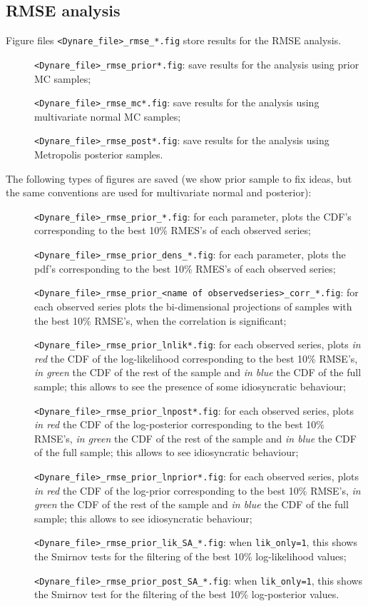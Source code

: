 \documentclass[12pt,a4paper]{article}
\begin{document}
\subsection{RMSE analysis}
Figure files \verb"<Dynare_file>_rmse_*.fig" store results for the
RMSE analysis.
\begin{description}
\item[]\verb"<Dynare_file>_rmse_prior*.fig": save results for
the analysis using prior MC samples;
\item[]\verb"<Dynare_file>_rmse_mc*.fig": save results for
the analysis using multivariate normal MC samples;
\item[]\verb"<Dynare_file>_rmse_post*.fig": save results for
the analysis using Metropolis posterior samples.
\end{description}

The following types of figures are saved (we show prior sample to
fix ideas, but the same conventions are used for multivariate
normal and posterior):
\begin{description}
\item[]\verb"<Dynare_file>_rmse_prior_*.fig": for each parameter, plots the CDF's
corresponding to the best 10\% RMES's of each observed series;
\item[]\verb"<Dynare_file>_rmse_prior_dens_*.fig": for each parameter, plots the pdf's
corresponding to the best 10\% RMES's of each observed series;
\item[]\verb"<Dynare_file>_rmse_prior_<name of observedseries>_corr_*.fig": for each observed series plots the
bi-dimensional projections of samples with the best 10\% RMSE's,
when the correlation is significant;
\item[]\verb"<Dynare_file>_rmse_prior_lnlik*.fig": for each observed
series, plots \emph{in red} the CDF of the log-likelihood
corresponding to the best 10\% RMSE's, \emph{in green} the CDF of
the rest of the sample and \emph{in blue }the CDF of the full
sample; this allows to see the  presence of some idiosyncratic
behaviour;
\item[]\verb"<Dynare_file>_rmse_prior_lnpost*.fig": for each observed
series, plots \emph{in red} the CDF of the log-posterior
corresponding to the best 10\% RMSE's, \emph{in green} the CDF of
the rest of the sample and \emph{in blue }the CDF of the full
sample; this allows to see idiosyncratic behaviour;
\item[]\verb"<Dynare_file>_rmse_prior_lnprior*.fig": for each observed
series, plots \emph{in red} the CDF of the log-prior corresponding
to the best 10\% RMSE's, \emph{in green} the CDF of the rest of
the sample and \emph{in blue }the CDF of the full sample; this
allows to see idiosyncratic behaviour;
\item[]\verb"<Dynare_file>_rmse_prior_lik_SA_*.fig": when
\verb"lik_only=1", this shows the Smirnov tests for the filtering
of the best 10\% log-likelihood values;
\item[]\verb"<Dynare_file>_rmse_prior_post_SA_*.fig": when
\verb"lik_only=1", this shows the Smirnov test for the filtering
of the best 10\% log-posterior values.
\end{description}
\end{document}
